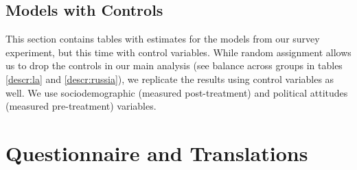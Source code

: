 \documentclass[11pt, ngerman,english,a4]{article}
\begin{document}
\subsection*{Models with Controls}


This section contains tables with estimates for the models from our survey experiment, but this time with control variables. While random assignment allows us to drop the controls in our main analysis (see balance across groups in tables \ref{descr:la} and \ref{descr:russia}), we replicate the results using control variables as well. We use sociodemographic (measured post-treatment) and political attitudes (measured pre-treatment) variables. 





\clearpage





\section*{Questionnaire and Translations}







\end{document}
